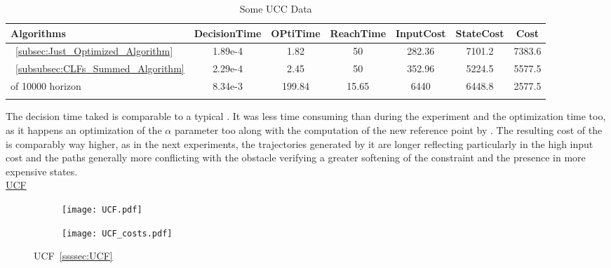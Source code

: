   \bgroup
 \begin{xltabular}{\textwidth}{|l|cccccc|}
   \toprule
   Algorithms   & DecisionTime & OPtiTime & ReachTime  & InputCost   & StateCost & Cost           \\
   \midrule
    ~\ref{subsec:Just_Optimized_Algorithm}           & 1.89e-4 & 1.82 & 50 & 282.36 & 7101.2 & 7383.6 \\
    ~\ref{subsubsec:CLFs_Summed_Algorithm}        & 2.29e-4 & 2.45 & 50 & 352.96 & 5224.5 & 5577.5 \\
     of 10000 horizon                                 & 8.34e-3 & 199.84  & 15.65  & 6440  & 6448.8 & 2577.5 \\
    \midrule
    \caption{Some UCC Data}
    \label{tab:Some_UCC_Data}\\
   \end{xltabular}
 \egroup

The  decision time taked is comparable to a typical . It was less time consuming than  during the experiment and the optimization time too, as it happens an optimization of the \(\alpha\) parameter too along with the computation of the new reference point by . The resulting cost of the  is comparably way higher, as in the next experiments, the trajectories generated by it are longer reflecting particularly in the high input cost and the paths generally more conflicting with the obstacle verifying a greater softening of the  constraint and the presence in more expensive states. \\


\underline{UCF}
\label{ssssec:UCF_experiments} %


\begin{figure}[htbp]
  \begin{subfigure}{0.55\textwidth}
    \centering
    \texttt{[image: UCF.pdf]}
  \label{fig:UCF_CostEvol}
  \end{subfigure}
  \begin{subfigure}{0.6\textwidth}
    \centering
    \texttt{[image: UCF\_costs.pdf]}
  \label{fig:UCF_trajectory}
  \end{subfigure}
  \caption{UCF~\ref{ssssec:UCF}}
\label{fig:UCFTrajectory_and_CostEvol}
\end{figure}



